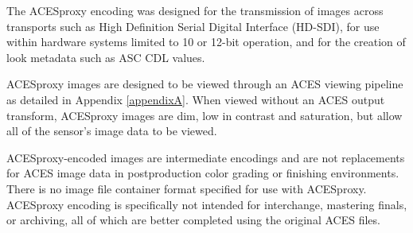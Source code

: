 The ACESproxy encoding was designed for the transmission of images across transports such as High Definition Serial Digital Interface (HD-SDI), for use within hardware systems limited to 10 or 12-bit operation, and for the creation of look metadata such as ASC CDL values.

ACESproxy images are designed to be viewed through an ACES viewing pipeline as detailed in Appendix \ref{appendixA}. When viewed without an ACES output transform, ACESproxy images are dim, low in contrast and saturation, but allow all of the sensor’s image data to be viewed.

ACESproxy-encoded images are intermediate encodings and are not replacements for ACES image data in postproduction color grading or finishing environments. There is no image file container format specified for use with ACESproxy. ACESproxy encoding is specifically not intended for interchange, mastering finals, or archiving, all of which are better completed using the original ACES files.